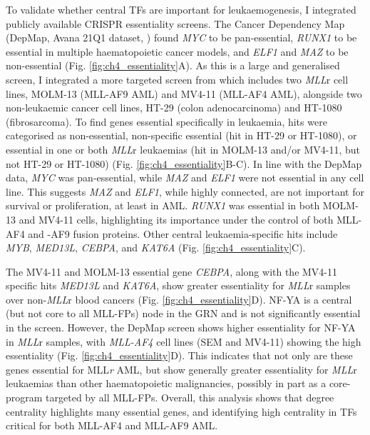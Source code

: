 To validate whether central TFs are important for leukaemogenesis, I integrated publicly available CRISPR essentiality screens. The Cancer Dependency Map (DepMap, Avana 21Q1 dataset, \cite{meyers_computational_2017, doench_optimized_2016}) found \textit{MYC} to be pan-essential, \textit{RUNX1} to be essential in multiple haematopoietic cancer models, and \textit{ELF1} and \textit{MAZ} to be non-essential (Fig. \ref{fig:ch4_essentiality}A). As this is a large and generalised screen, I integrated a more targeted screen from \cite{tzelepis_crispr_2016} which includes two \textit{MLL}r cell lines, MOLM-13 (MLL-AF9 AML) and MV4-11 (MLL-AF4 AML), alongside two non-leukaemic cancer cell lines, HT-29 (colon adenocarcinoma) and HT-1080 (fibrosarcoma). To find genes essential specifically in leukaemia, hits were categorised as non-essential, non-specific essential (hit in HT-29 or HT-1080), or essential in one or both \textit{MLL}r leukaemias (hit in MOLM-13 and/or MV4-11, but not HT-29 or HT-1080) (Fig. \ref{fig:ch4_essentiality}B-C). In line with the DepMap data, \textit{MYC} was pan-essential, while \textit{MAZ} and \textit{ELF1} were not essential in any cell line. This suggests \textit{MAZ} and \textit{ELF1}, while highly connected, are not important for survival or proliferation, at least in AML. \textit{RUNX1} was essential in both MOLM-13 and MV4-11 cells, highlighting its importance under the control of both MLL-AF4 and -AF9 fusion proteins. Other central leukaemia-specific hits include \textit{MYB}, \textit{MED13L}, \textit{CEBPA}, and \textit{KAT6A} (Fig. \ref{fig:ch4_essentiality}C). 

The MV4-11 and MOLM-13 essential gene \textit{CEBPA}, along with the MV4-11 specific hits \textit{MED13L} and \textit{KAT6A}, show greater essentiality for \textit{MLL}r samples over non-\textit{MLL}r blood cancers (Fig. \ref{fig:ch4_essentiality}D). NF-YA is a central (but not core to all MLL-FPs) node in the GRN and is not significantly essential in the \cite{tzelepis_crispr_2016} screen. However, the DepMap screen shows higher essentiality for NF-YA in \textit{MLL}r samples, with \textit{MLL-AF4} cell lines (SEM and MV4-11) showing the high essentiality (Fig. \ref{fig:ch4_essentiality}D). This indicates that not only are these genes essential for MLL\textit{r} AML, but show generally greater essentiality for \textit{MLL}r leukaemias than other haematopoietic malignancies, possibly in part as a core-program targeted by all MLL-FPs. Overall, this analysis shows that degree centrality highlights many essential genes, and identifying high centrality in TFs critical for both MLL-AF4 and MLL-AF9 AML.


